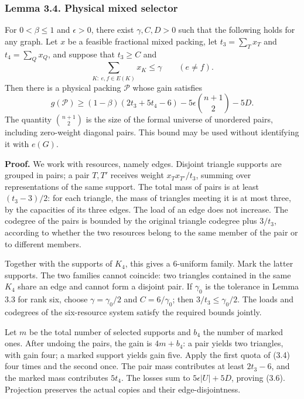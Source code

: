 \documentclass[english,11pt,a4paper]{article}
\begin{document}
\subsubsection{Lemma 3.4. Physical mixed selector}\label{lemma-3.4.-physical-mixed-selector}

For \(0<\beta\le1\) and \(\epsilon>0\), there exist \(\gamma,C,D>0\) such that the following holds for any graph. Let \(x\) be a feasible fractional mixed packing, let \(t_3=\sum_Tx_T\) and \(t_4=\sum_Qx_Q\), and suppose that \(t_3\ge C\) and \[
\sum_{K:\ e,f\in E(K)}x_K\le\gamma\qquad(e\ne f).
\tag{3.5}
\] Then there is a physical packing \(\mathcal P\) whose gain satisfies \[
g(\mathcal P)\ge(1-\beta)(2t_3+5t_4-6)
 -5\epsilon\binom{n+1}{2}-5D.
\tag{3.6}
\] The quantity \(\binom{n+1}{2}\) is the size of the formal universe of unordered pairs, including zero-weight diagonal pairs. This bound may be used without identifying it with \(e(G)\).

\textbf{Proof.} We work with resources, namely edges. Disjoint triangle supports are grouped in pairs; a pair \(T,T'\) receives weight \(x_Tx_{T'}/t_3\), summing over representations of the same support. The total mass of pairs is at least \((t_3-3)/2\): for each triangle, the mass of triangles meeting it is at most three, by the capacities of its three edges. The load of an edge does not increase. The codegree of the pairs is bounded by the original triangle codegree plus \(3/t_3\), according to whether the two resources belong to the same member of the pair or to different members.

Together with the supports of \(K_4\), this gives a 6-uniform family. Mark the latter supports. The two families cannot coincide: two triangles contained in the same \(K_4\) share an edge and cannot form a disjoint pair. If \(\gamma_0\) is the tolerance in Lemma 3.3 for rank six, choose \(\gamma=\gamma_0/2\) and \(C=6/\gamma_0\); then \(3/t_3\le\gamma_0/2\). The loads and codegrees of the six-resource system satisfy the required bounds jointly.

Let \(m\) be the total number of selected supports and \(b_4\) the number of marked ones. After undoing the pairs, the gain is \(4m+b_4\): a pair yields two triangles, with gain four; a marked support yields gain five. Apply the first quota of (3.4) four times and the second once. The pair mass contributes at least \(2t_3-6\), and the marked mass contributes \(5t_4\). The losses sum to \(5\epsilon|U|+5D\), proving (3.6). Projection preserves the actual copies and their edge-disjointness.
\end{document}
